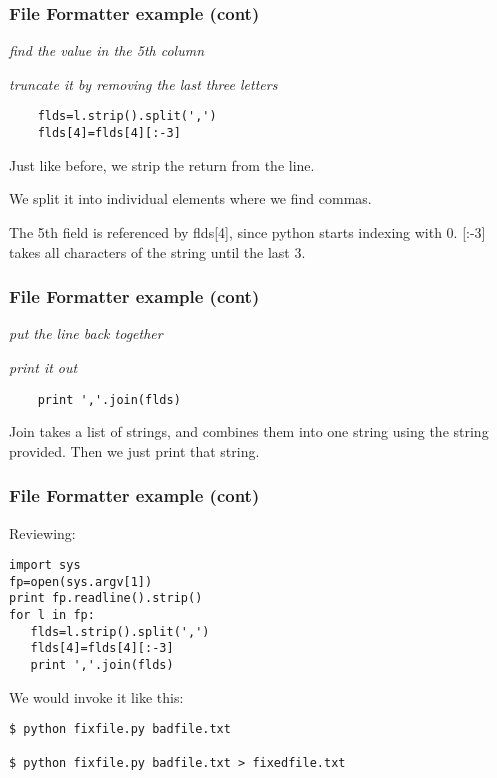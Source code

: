 \documentclass[10pt]{beamer}
\begin{document}
\begin{frame}[fragile]
\frametitle{File Formatter example (cont)}

\textit{find the value in the 5th column}

\textit{truncate it by removing the last three letters}

\begin{verbatim}
    flds=l.strip().split(',')
    flds[4]=flds[4][:-3]
\end{verbatim}

Just like before, we strip the return from the line.  
\vspace{2mm}

We split it into
individual elements where we find commas.  
\vspace{2mm}

The 5th field is referenced by
flds[4], since python starts indexing with 0.  [:-3] takes all characters
of the string until the last 3.
  
\end{frame}

\begin{frame}[fragile]
\frametitle{File Formatter example (cont)}


\textit{put the line back together}

\textit{print it out}

\begin{verbatim}
    print ','.join(flds)
\end{verbatim}

Join takes a list of strings, and combines them into one string using the 
string provided. Then we just print that string.  
 
\end{frame}

\begin{frame}[fragile]
\frametitle{File Formatter example (cont)}

Reviewing:

\begin{verbatim}
import sys
fp=open(sys.argv[1])
print fp.readline().strip()
for l in fp:
   flds=l.strip().split(',')
   flds[4]=flds[4][:-3]
   print ','.join(flds)
\end{verbatim}


We would invoke it like this:
\begin{verbatim}
$ python fixfile.py badfile.txt

$ python fixfile.py badfile.txt > fixedfile.txt
\end{verbatim}

\end{frame}
\end{document}
